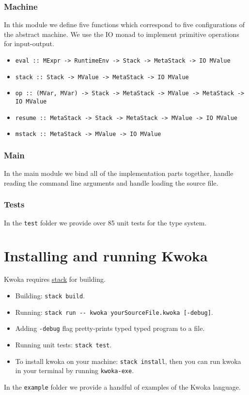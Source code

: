\documentclass[a4paper]{article}
\begin{document}
\subsubsection*{Machine}
In this module we define five functions which correspond to five configurations of the abstract machine.
We use the IO monad to implement primitive operations for input-output.
\begin{itemize}
  \item \verb+eval :: MExpr -> RuntimeEnv -> Stack -> MetaStack -> IO MValue+
  \item \verb+stack :: Stack -> MValue -> MetaStack -> IO MValue+
  \item \verb+op :: (MVar, MVar) -> Stack -> MetaStack -> MValue -> MetaStack -> IO MValue+
  \item \verb+resume :: MetaStack -> Stack -> MetaStack -> MValue -> IO MValue+
  \item \verb+mstack :: MetaStack -> MValue -> IO MValue+
\end{itemize}

\subsubsection*{Main}

In the main module we bind all of the implementation parts together, handle reading the command line arguments and
handle loading the source file.

\subsubsection*{Tests}
In the \verb+test+ folder we provide over 85 unit tests for the type system.

\section{Installing and running Kwoka}
Kwoka requires {\href{https://docs.haskellstack.org/en/stable/README/}{\color{blue}stack}} for building.
\begin{itemize}
    \item Building: \verb+stack build+.
    \item Running: \verb+stack run -- kwoka yourSourceFile.kwoka [-debug]+.
    \item Adding \verb+-debug+ flag pretty-prints typed typed program to a file.
    \item Running unit tests: \verb+stack test+.
    \item To install kwoka on your machine: \verb+stack install+,
          then you can run kwoka in your terminal by running \verb+kwoka-exe+.
\end{itemize}
In the \verb+example+ folder we provide a handful of examples of the Kwoka language.
\end{document}
